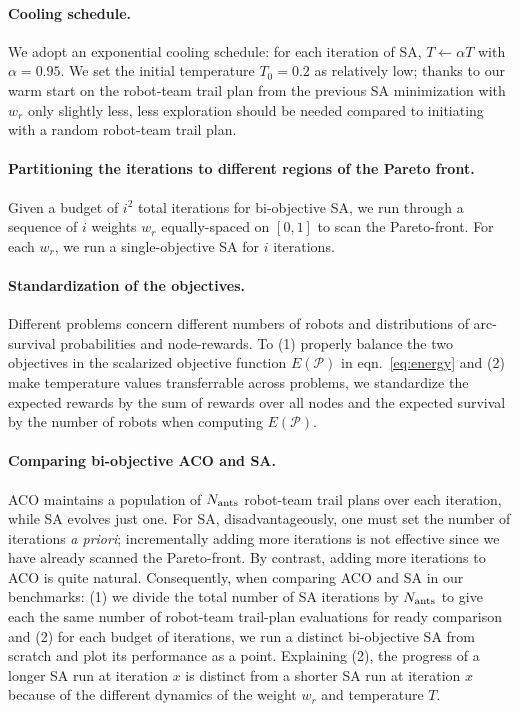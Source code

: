 \documentclass[fleqn,10pt,lineno]{wlpeerj}
\begin{document}
\paragraph{Cooling schedule.}
We adopt an exponential cooling schedule: for each iteration of SA, $T \leftarrow \alpha T$ with $\alpha=0.95$. We set the initial temperature $T_0=0.2$ as relatively low; thanks to our warm start on the robot-team trail plan from the previous SA minimization with $w_r$ only slightly less, less exploration should be needed compared to initiating with a random robot-team trail plan.

\paragraph{Partitioning the iterations to different regions of the Pareto front.}
Given a budget of $i^2$ total iterations for bi-objective SA, we run through a sequence of $i$ weights $w_r$ equally-spaced on $[0, 1]$ to scan the Pareto-front. For each $w_r$, we run a single-objective SA for $i$ iterations. 

\paragraph{Standardization of the objectives.}
Different problems concern different numbers of robots and distributions of arc-survival probabilities and node-rewards.
To (1) properly balance the two objectives in the scalarized objective function $E(\mathcal{P})$ in eqn.~\ref{eq:energy} and (2) make temperature values transferrable across problems, we standardize the expected rewards by the sum of rewards over all nodes and the expected survival by the number of robots when computing $E(\mathcal{P})$.

\paragraph{Comparing bi-objective ACO and SA.}
ACO maintains a population of $N_{\rm ants}$ robot-team trail plans over each iteration, while SA evolves just one.
For SA, disadvantageously, one must set the number of iterations \emph{a priori}; incrementally adding more iterations is not effective since we have already scanned the Pareto-front. By contrast, adding more iterations to ACO is quite natural.
Consequently, when comparing ACO and SA in our benchmarks: 
(1) we divide the total number of SA iterations by $N_{\rm ants}$ to give each the same number of robot-team trail-plan evaluations for ready comparison and 
(2) for each budget of iterations, we run a distinct bi-objective SA from scratch and plot its performance as a point. Explaining (2), the progress of a longer SA run at iteration $x$ is distinct from a shorter SA run at iteration $x$ because of the different dynamics of the weight $w_r$ and temperature $T$.
\end{document}
